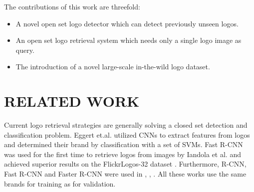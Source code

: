 \documentclass[a4paper,twoside]{article}
\newcommand{\xie}{i.e.}
\newcommand{\xeg}{e.g.}
\begin{document}
The contributions of this work are threefold:
\begin{itemize}
\item A novel open set logo detector which can detect previously unseen logos.
\item An open set logo retrieval system which needs only a single logo image as query.
\item The introduction of a novel large-scale in-the-wild logo dataset.
\end{itemize}




\section{\uppercase{Related Work}}
\noindent Current logo retrieval strategies are generally solving a closed set detection and classification problem. Eggert et.al. \cite{eggert2015} utilized \acp{CNN} to extract features from logos and determined their brand by classification with a set of \acp{SVM}. Fast R-CNN \cite{girshick2015} was used for the first time to retrieve logos from images by Iandola et al. \cite{iandola2015} and achieved superior results on the FlickrLogos-32 dataset \cite{romberg2011}. Furthermore, R-CNN, Fast R-CNN and Faster R-CNN were used in \cite{bao2016}, \cite{oliveira2016}, \cite{qi2017}. All these works use the same brands for training as for validation.

\end{document}
